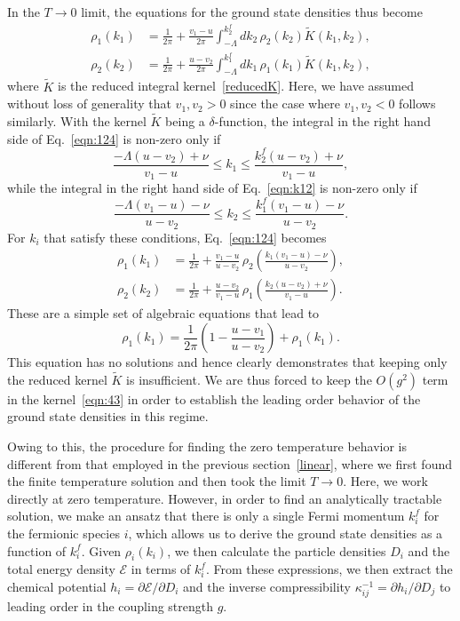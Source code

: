 \documentclass[aps,pra,
superscriptaddress,
reprint,twocolumn,preprintnumbers,
amsmath,amssymb,
nofootinbib]{revtex4-1}
\begin{document}
In the $T\to0$ limit, the equations for the ground state densities thus become
        \begin{align}
        \label{eqn:124}
        \rho_1(k_1) & = \frac{1}{2\pi} + \frac{v_1 - u }{2 \pi} \int_{-\Lambda}^{k_2^f}dk_2\,\rho_2(k_2)\tilde{K}(k_1,k_2),  \\
        \rho_2(k_2) & = \frac{1}{2\pi} + \frac{u - v_2}{2 \pi} \int_{-\Lambda}^{k_1^f}dk_1\,\rho_1(k_1)\tilde{K}(k_1,k_2), \label{eqn:k12}
        \end{align}
where $\tilde{K}$ is the reduced integral kernel~\eqref{reducedK}. Here, we have assumed without loss of generality that $v_1,v_2>0$ since the case where $v_1,v_2<0$ follows similarly. With the kernel $\tilde{K}$ being a $\delta$-function, the integral in the right hand side of Eq.~\eqref{eqn:124} is non-zero only if
		\begin{equation}
		\frac{-\Lambda(u - v_2) + \nu}{ v_1-u} \leq k_1 \leq \frac{k_2^f(u - v_2) + \nu}{v_1-u} ,
		\end{equation}
while the integral in the right hand side of Eq.~\eqref{eqn:k12} is non-zero only if
		\begin{equation}		
		\frac{-\Lambda ( v_1-u) - \nu}{u - v_2}  \leq k_2 \leq \frac{k_1^f ( v_1 - u) - \nu}{u - v_2}.
		\end{equation}
For $k_i$ that satisfy these conditions, Eq.~\eqref{eqn:124} becomes		
        \begin{align}
        \rho_1(k_1) &= \frac{1}{2\pi} + \frac{v_1 - u}{u - v_2}\,\rho_2\left(\frac{k_1 ( v_1-u)-\nu}{u - v_2}\right), \nonumber \\
        \rho_2(k_2) &= \frac{1}{2\pi} + \frac{u - v_2}{v_1-u}\,\rho_1\left(\frac{k_2(u - v_2) + \nu}{ v_1-u}\right).
        \end{align}
These are a simple set of algebraic equations that lead to 
		\begin{equation}
		\rho_1(k_1) = \frac{1}{2\pi}\left(1 - \frac{u - v_1}{u - v_2}\right) + \rho_1(k_1).
		\end{equation}		
This equation has no solutions and hence clearly demonstrates that keeping only the reduced kernel $\tilde{K}$ is insufficient. We are thus forced to keep the $O(g^2)$ term in the kernel~\eqref{eqn:43} in order to establish the leading order behavior of the ground state densities in this regime.

Owing to this, the procedure for finding the zero temperature behavior is different from that employed in the previous section~\ref{linear}, where we first found the finite temperature solution and then took the limit $T\to0$. Here, we work directly at zero temperature. However, in order to find an analytically tractable solution, we make an ansatz that there is only a single Fermi momentum $k_i^f$ for the fermionic species $i$, which allows us to derive the ground state densities as a function of $k_i^f$. Given $\rho_i(k_i)$, we then calculate the particle densities $D_i$ and the total energy density $\mathcal{E}$ in terms of $k_i^f$. From these expressions, we then extract the chemical potential $h_i = \partial \mathcal{E}/\partial D_i$ and the inverse compressibility $\kappa_{ij}^{-1} = \partial h_i/\partial D_j$ to leading order in the coupling strength $g$. 
        
\end{document}
